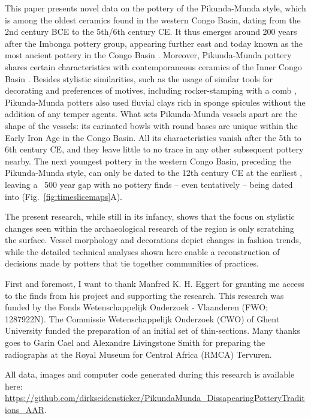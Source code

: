 \documentclass[smallextended,natbib]{svjour3}       %
\begin{document}
This paper presents novel data on the pottery of the Pikunda-Munda style, which is among the oldest ceramics found in the western Congo Basin, dating from the 2nd century BCE to the 5th/6th century CE. It thus emerges around 200 years after the Imbonga pottery group, appearing further east and today known as the most ancient pottery in the Congo Basin \cite[Fig.~\ref{fig:timeslicemaps};][59--68]{Wotzka.1995}. Moreover, Pikunda-Munda pottery shares certain characteristics with contemporaneous ceramics of the Inner Congo Basin \citep[107 Ftn.~4]{Wotzka.1995}. Besides stylistic similarities, such as the usage of similar tools for decorating and preferences of motives, including rocker-stamping with a comb \citep[118 Tab.~14]{Seidensticker.2021e}, Pikunda-Munda potters also used fluvial clays rich in sponge spicules without the addition of any temper agents. What sets Pikunda-Munda vessels apart are the shape of the vessels: its carinated bowls with round bases are unique within the Early Iron Age in the Congo Basin. All its characteristics vanish after the 5th to 6th century CE, and they leave little to no trace in any other subsequent pottery nearby. The next youngest pottery in the western Congo Basin, preceding the Pikunda-Munda style, can only be dated to the 12th century CE at the earliest \citep[Tab.~2: RICH-30864]{Seidensticker.2024}, leaving a ~500 year gap with no pottery finds -- even tentatively -- being dated into (Fig.~\ref{fig:timeslicemaps}A).

The present research, while still in its infancy, shows that the focus on stylistic changes seen within the archaeological research of the region \citep{Wotzka.1995,Seidensticker.2021e} is only scratching the surface. Vessel morphology and decorations depict changes in fashion trends, while the detailed technical analyses shown here enable a reconstruction of decisions made by potters that tie together communities of practices.

\begin{acknowledgements}
First and foremost, I want to thank Manfred K. H. Eggert for granting me access to the finds from his project and supporting the research. This research was funded by the Fonds Wetenschappelijk Onderzoek - Vlaanderen (FWO; 1287922N). The Commissie Wetenschappelijk Onderzoek (CWO) of Ghent University funded the preparation of an initial set of thin-sections. Many thanks goes to Garin Cael and Alexandre Livingstone Smith for preparing the radiographs at the Royal Museum for Central Africa (RMCA) Tervuren.

All data, images and computer code generated during this research is available here: \url{https://github.com/dirkseidensticker/PikundaMunda_DissapearingPotteryTraditions_AAR}.
\end{acknowledgements}



\end{document}
